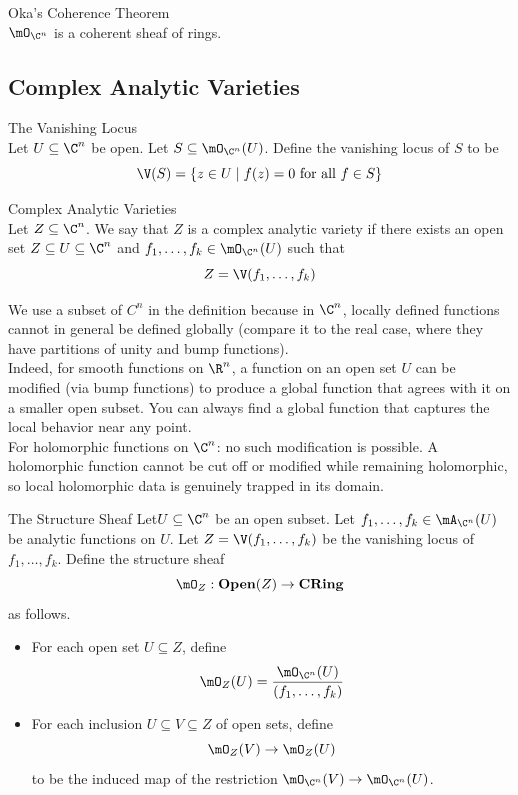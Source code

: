 \documentclass[a4paper]{article}
\begin{document}
\begin{thm}{Oka's Coherence Theorem}{}\\
$\mO_{\C^n}$ is a coherent sheaf of rings. 
\end{thm}

\subsection{Complex Analytic Varieties}
\begin{defn}{The Vanishing Locus}{}\\
Let $U\subseteq\C^n$ be open. Let $S\subseteq\mO_{\C^n}(U)$. Define the vanishing locus of $S$ to be $$\V(S)=\{z\in U\;|\;f(z)=0\text{ for all }f\in S\}$$
\end{defn}

\begin{defn}{Complex Analytic Varieties}{}\\
Let $Z\subseteq\C^n$. We say that $Z$ is a complex analytic variety if there exists an open set $Z\subseteq U\subseteq\C^n$ and $f_1,\dots,f_k\in\mO_{\C^n}(U)$ such that $$Z=\V(f_1,\dots,f_k)$$
\end{defn}

We use a subset of $C^n$ in the definition because in $\C^n$, locally defined functions cannot in general be defined globally (compare it to the real case, where they have partitions of unity and bump functions). \\

Indeed, for smooth functions on $\R^n$, a function on an open set $U$ can be modified (via bump functions) to produce a global function that agrees with it on a smaller open subset. You can always find a global function that captures the local behavior near any point. \\

For holomorphic functions on $\C^n$: no such modification is possible. A holomorphic function cannot be cut off or modified while remaining holomorphic, so local holomorphic data is genuinely trapped in its domain.

\begin{defn}{The Structure Sheaf}{} Let$ U\subseteq\C^n$ be an open subset. Let $f_1,\dots,f_k\in\mA_{\C^n}(U)$ be analytic functions on $U$. Let $Z=\V(f_1,\dots,f_k)$ be the vanishing locus of $f_1,\dots,f_k$. Define the structure sheaf $$\mO_Z:\bold{Open}(Z)\to\bold{CRing}$$ as follows. 
\begin{itemize}
\item For each open set $U\subseteq Z$, define $$\mO_Z(U)=\frac{\mO_{\C^n}(U)}{(f_1,\dots,f_k)}$$
\item For each inclusion $U\subseteq V\subseteq Z$ of open sets, define $$\mO_Z(V)\to\mO_Z(U)$$ to be the induced map of the restriction $\mO_{\C^n}(V)\to\mO_{\C^n}(U)$. 
\end{itemize}
\end{defn}
\end{document}
